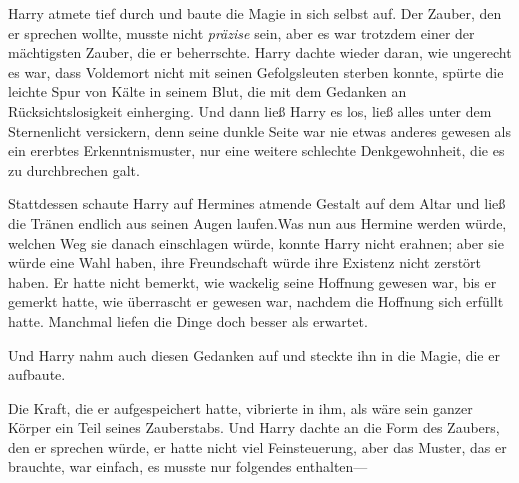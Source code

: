 Harry atmete tief durch und baute die Magie in sich selbst auf. Der Zauber, den er sprechen wollte, musste nicht \emph{präzise} sein, aber es war trotzdem einer der mächtigsten Zauber, die er beherrschte.
Harry dachte wieder daran, wie ungerecht es war, dass Voldemort nicht mit seinen Gefolgsleuten sterben konnte, spürte die leichte Spur von Kälte in seinem Blut, die mit dem Gedanken an Rücksichtslosigkeit einherging. Und dann ließ Harry es los, ließ alles unter dem Sternenlicht versickern, denn seine dunkle Seite war nie etwas anderes gewesen als ein ererbtes Erkenntnismuster, nur eine weitere schlechte Denkgewohnheit, die es zu durchbrechen galt.

Stattdessen schaute Harry auf Hermines atmende Gestalt auf dem Altar und ließ die Tränen endlich aus seinen Augen laufen.Was nun aus Hermine werden würde, welchen Weg sie danach einschlagen würde, konnte Harry nicht erahnen; aber sie würde eine Wahl haben, ihre Freundschaft würde ihre Existenz nicht zerstört haben. Er hatte nicht bemerkt, wie wackelig seine Hoffnung gewesen war, bis er gemerkt hatte, wie überrascht er gewesen war, nachdem die Hoffnung sich erfüllt hatte. Manchmal liefen die Dinge doch besser als erwartet.

Und Harry nahm auch diesen Gedanken auf und steckte ihn in die Magie, die er aufbaute.

Die Kraft, die er aufgespeichert hatte, vibrierte in ihm, als wäre sein ganzer Körper ein Teil seines Zauberstabs. Und Harry dachte an die Form des Zaubers, den er sprechen würde, er hatte nicht viel Feinsteuerung, aber das Muster, das er brauchte, war einfach, es musste nur folgendes enthalten—

